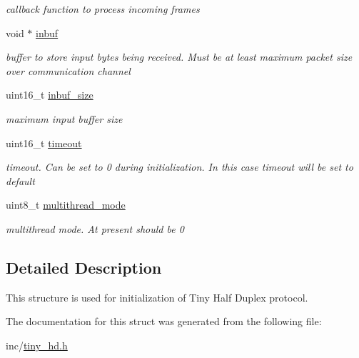 \begin{DoxyCompactItemize}
\begin{DoxyCompactList}\small\item\em callback function to process incoming frames \end{DoxyCompactList}\item 
\hypertarget{structSTinyHdInit___a5996a48606a90ff9938e4037612cf97d}{}void $\ast$ \hyperlink{structSTinyHdInit___a5996a48606a90ff9938e4037612cf97d}{inbuf}\label{structSTinyHdInit___a5996a48606a90ff9938e4037612cf97d}

\begin{DoxyCompactList}\small\item\em buffer to store input bytes being received. Must be at least maximum packet size over communication channel \end{DoxyCompactList}\item 
\hypertarget{structSTinyHdInit___a0eed47c62a16fa29435d480541989cf6}{}uint16\+\_\+t \hyperlink{structSTinyHdInit___a0eed47c62a16fa29435d480541989cf6}{inbuf\+\_\+size}\label{structSTinyHdInit___a0eed47c62a16fa29435d480541989cf6}

\begin{DoxyCompactList}\small\item\em maximum input buffer size \end{DoxyCompactList}\item 
\hypertarget{structSTinyHdInit___ac7a1ae9314efc1296d78927198f07ac8}{}uint16\+\_\+t \hyperlink{structSTinyHdInit___ac7a1ae9314efc1296d78927198f07ac8}{timeout}\label{structSTinyHdInit___ac7a1ae9314efc1296d78927198f07ac8}

\begin{DoxyCompactList}\small\item\em timeout. Can be set to 0 during initialization. In this case timeout will be set to default \end{DoxyCompactList}\item 
\hypertarget{structSTinyHdInit___a404947e25922fa8400daa924a032897e}{}uint8\+\_\+t \hyperlink{structSTinyHdInit___a404947e25922fa8400daa924a032897e}{multithread\+\_\+mode}\label{structSTinyHdInit___a404947e25922fa8400daa924a032897e}

\begin{DoxyCompactList}\small\item\em multithread mode. At present should be 0 \end{DoxyCompactList}\end{DoxyCompactItemize}


\subsection{Detailed Description}
This structure is used for initialization of Tiny Half Duplex protocol. 

The documentation for this struct was generated from the following file\+:\begin{DoxyCompactItemize}
\item 
inc/\hyperlink{tiny__hd_8h}{tiny\+\_\+hd.\+h}\end{DoxyCompactItemize}
